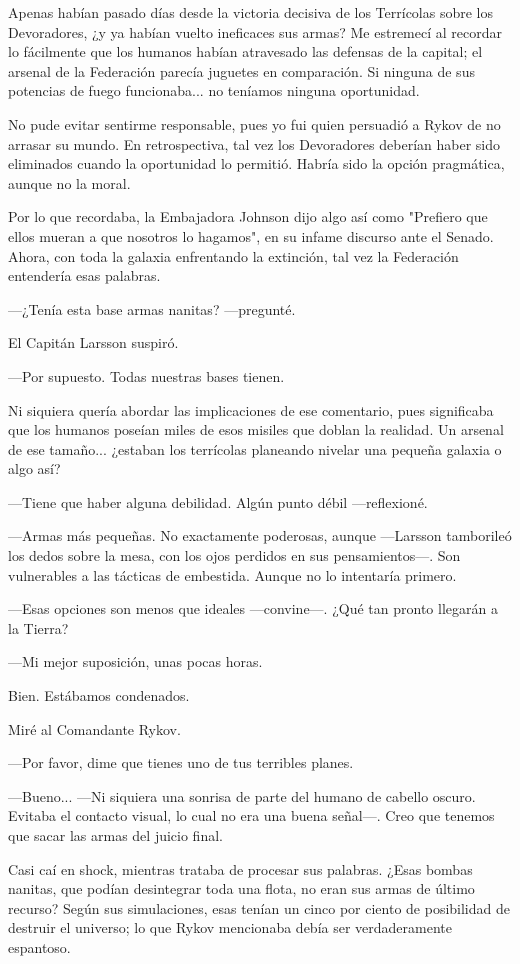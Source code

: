 Apenas habían pasado días desde la victoria decisiva de los Terrícolas sobre los Devoradores, ¿y ya habían vuelto ineficaces sus armas? Me estremecí al recordar lo fácilmente que los humanos habían atravesado las defensas de la capital; el arsenal de la Federación parecía juguetes en comparación. Si ninguna de sus potencias de fuego funcionaba... no teníamos ninguna oportunidad.

No pude evitar sentirme responsable, pues yo fui quien persuadió a Rykov de no arrasar su mundo. En retrospectiva, tal vez los Devoradores deberían haber sido eliminados cuando la oportunidad lo permitió. Habría sido la opción pragmática, aunque no la moral.

Por lo que recordaba, la Embajadora Johnson dijo algo así como "Prefiero que ellos mueran a que nosotros lo hagamos", en su infame discurso ante el Senado. Ahora, con toda la galaxia enfrentando la extinción, tal vez la Federación entendería esas palabras.

—¿Tenía esta base armas nanitas? —pregunté.

El Capitán Larsson suspiró.

—Por supuesto. Todas nuestras bases tienen.

Ni siquiera quería abordar las implicaciones de ese comentario, pues significaba que los humanos poseían miles de esos misiles que doblan la realidad. Un arsenal de ese tamaño... ¿estaban los terrícolas planeando nivelar una pequeña galaxia o algo así?

—Tiene que haber alguna debilidad. Algún punto débil —reflexioné.

—Armas más pequeñas. No exactamente poderosas, aunque —Larsson tamborileó los dedos sobre la mesa, con los ojos perdidos en sus pensamientos—. Son vulnerables a las tácticas de embestida. Aunque no lo intentaría primero.

—Esas opciones son menos que ideales —convine—. ¿Qué tan pronto llegarán a la Tierra?

—Mi mejor suposición, unas pocas horas.

Bien. Estábamos condenados.

Miré al Comandante Rykov.

—Por favor, dime que tienes uno de tus terribles planes.

—Bueno... —Ni siquiera una sonrisa de parte del humano de cabello oscuro. Evitaba el contacto visual, lo cual no era una buena señal—. Creo que tenemos que sacar las armas del juicio final.

Casi caí en shock, mientras trataba de procesar sus palabras. ¿Esas bombas nanitas, que podían desintegrar toda una flota, no eran sus armas de último recurso? Según sus simulaciones, esas tenían un cinco por ciento de posibilidad de destruir el universo; lo que Rykov mencionaba debía ser verdaderamente espantoso.

